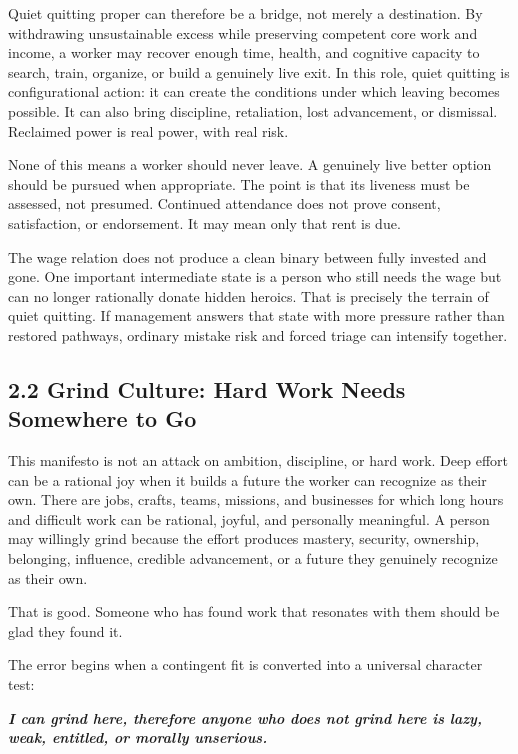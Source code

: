 \documentclass[11pt,oneside]{article}
\renewenvironment{quote}
  {\begin{tcolorbox}[
      enhanced,
      breakable,
      colback=ManifestLight,
      colframe=ManifestRule,
      boxrule=0pt,
      leftrule=3pt,
      arc=0pt,
      outer arc=0pt,
      left=10pt,right=10pt,top=8pt,bottom=8pt,
      before skip=0.8em,after skip=0.8em
    ]\itshape}
  {\end{tcolorbox}}
\begin{document}
Quiet quitting proper can therefore be a bridge, not merely a
destination. By withdrawing unsustainable excess while preserving
competent core work and income, a worker may recover enough time,
health, and cognitive capacity to search, train, organize, or build a
genuinely live exit. In this role, quiet quitting is configurational
action: it can create the conditions under which leaving becomes
possible. It can also bring discipline, retaliation, lost advancement,
or dismissal. Reclaimed power is real power, with real risk.

None of this means a worker should never leave. A genuinely live better
option should be pursued when appropriate. The point is that its
liveness must be assessed, not presumed. Continued attendance does not
prove consent, satisfaction, or endorsement. It may mean only that rent
is due.

The wage relation does not produce a clean binary between fully invested
and gone. One important intermediate state is a person who still needs
the wage but can no longer rationally donate hidden heroics. That is
precisely the terrain of quiet quitting. If management answers that
state with more pressure rather than restored pathways, ordinary mistake
risk and forced triage can intensify together.

\hypertarget{grind-culture-hard-work-needs-somewhere-to-go}{%
\subsection{2.2 Grind Culture: Hard Work Needs Somewhere to
Go}\label{grind-culture-hard-work-needs-somewhere-to-go}}

This manifesto is not an attack on ambition, discipline, or hard work.
Deep effort can be a rational joy when it builds a future the worker can
recognize as their own. There are jobs, crafts, teams, missions, and
businesses for which long hours and difficult work can be rational,
joyful, and personally meaningful. A person may willingly grind because
the effort produces mastery, security, ownership, belonging, influence,
credible advancement, or a future they genuinely recognize as their own.

That is good. Someone who has found work that resonates with them should
be glad they found it.

The error begins when a contingent fit is converted into a universal
character test:

\begin{quote}
\textbf{I can grind here, therefore anyone who does not grind here is
lazy, weak, entitled, or morally unserious.}
\end{quote}
\end{document}
